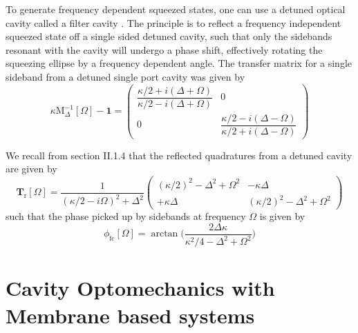 To generate frequency dependent squeezed states, one can use a detuned optical cavity called a filter cavity \cite{kimble_conversion_2001}. The principle is to reflect a frequency independent squeezed state off a single sided detuned cavity, such that only the sidebands resonant with the cavity will undergo a phase shift, effectively rotating the squeezing ellipse by a frequency dependent angle. 
The transfer matrix for a single sideband from a detuned single port cavity was given by
\begin{equation*}
    \kappa \mathrm M_{\Delta}^{-1}[\Omega]  - \mathbf{1} = \begin{pmatrix}
      \dfrac{\kappa/2 + i(\Delta + \Omega)}{\kappa/2 - i(\Delta + \Omega)} & 0 \\[10pt]
      0 & \dfrac{\kappa/2 - i(\Delta - \Omega)}{\kappa/2+ i(\Delta - \Omega)}
    \end{pmatrix}
\end{equation*}


We recall from section II.1.4 that the reflected quadratures from a detuned cavity are given by
\begin{equation*}
    \mathbf{T}_{\mathrm{r}}[\Omega]=  \frac{1}{(\kappa/2 - i\Omega)^{2}+\Delta^{2}}
\begin{pmatrix}
     (\kappa/2)^2 - \Delta^2 + \Omega^2  & - \kappa \Delta  \\[6pt]
    + \kappa \Delta  & ( \kappa/2)^2 - \Delta^2 + \Omega^2 
\end{pmatrix}
\end{equation*}
such that the phase picked up by sidebands at frequency $\Omega$ is given by
\begin{equation}
    \phi_{\mathrm{fc}}[\Omega] = \arctan \Big(\dfrac{2 \Delta \kappa }{\kappa^2/4 - \Delta^2 + \Omega^2}\Big) 
\end{equation}



\section{Cavity Optomechanics with Membrane based systems }
